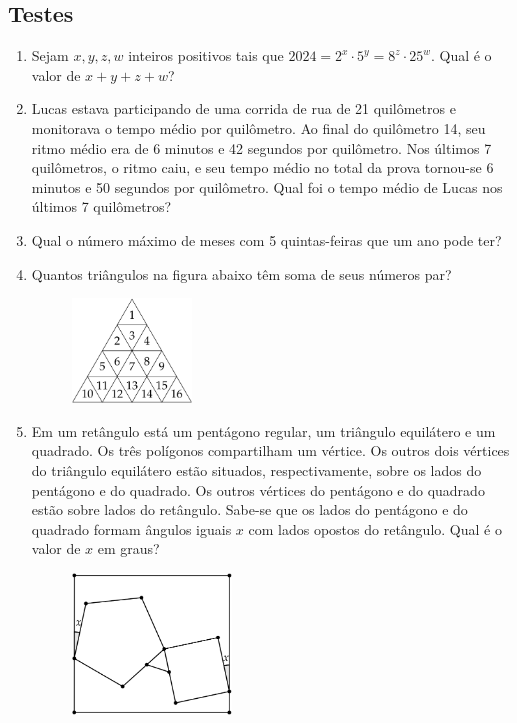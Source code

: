 \documentclass[12pt]{article}
\begin{document}
    \subsection{Testes}
      \begin{enumerate}[label=\textbf{\arabic*.}]
        \item Sejam \(x, y, z, w\) inteiros positivos tais que \(2024 = 2^x \cdot 5^y = 8^z \cdot 25^w\). Qual é o valor de \(x + y + z + w\)?
        \item Lucas estava participando de uma corrida de rua de 21 quilômetros e monitorava o tempo médio por quilômetro. Ao final do quilômetro
          14, seu ritmo médio era de 6 minutos e 42 segundos por quilômetro. Nos últimos 7 quilômetros, o ritmo caiu, e seu tempo médio no total
          da prova tornou-se 6 minutos e 50 segundos por quilômetro. Qual foi o tempo médio de Lucas nos últimos 7 quilômetros?
        \item Qual o número máximo de meses com 5 quintas-feiras que um ano pode ter?
        \item Quantos triângulos na figura abaixo têm soma de seus números par?
          \begin{figure}[h]
            \centering
            \includegraphics[width=0.3\textwidth]{first.png}
          \end{figure}
        \item Em um retângulo está um pentágono regular, um triângulo equilátero e um quadrado. Os três polígonos compartilham um vértice.
          Os outros dois vértices do triângulo equilátero estão situados, respectivamente, sobre os lados do pentágono e do quadrado. Os outros
          vértices do pentágono e do quadrado estão sobre lados do retângulo. Sabe-se que os lados do pentágono e do quadrado formam ângulos
          iguais \(x\) com lados opostos do retângulo. Qual é o valor de \(x\) em graus?
          \begin{figure}[h]
            \centering
            \includegraphics[width=0.4\textwidth]{second.png}
          \end{figure}


\end{enumerate}
\end{document}
